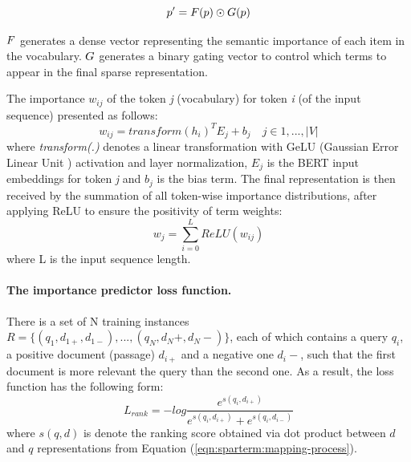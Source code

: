 \documentclass[
    twocolumn,
]{ceurart}
\begin{document}
    \begin{equation}
        \label{eqn:sparterm:mapping-process}
        p' = \mathnormal{F}(p) \odot \mathnormal{G}(p)
    \end{equation}

    $\mathnormal{F}$ generates a dense vector representing the semantic importance of each item
    in the vocabulary. $\mathnormal{G}$ generates a binary gating vector to control which terms
    to appear in the final sparse representation.

    The importance $w_{ij}$ of the token \emph{j} (vocabulary) for token \emph{i} (of the input
    sequence) presented as follows:
    \begin{equation}
        w_{ij}=transform(h_i)^T E_j + b_j \quad j \in {1, ..., |V|}
    \end{equation}
    where \emph{transform(.)} denotes a linear transformation with GeLU
    (Gaussian Error Linear Unit \cite{hendrycks2016gelu}) activation and layer normalization,
    $E_j$ is the BERT input embeddings for token \emph{j} and $b_j$ is the bias term.
    The final representation is then received by the summation of all token-wise importance
    distributions, after applying ReLU to ensure the positivity of term weights:
    \begin{equation}
        \label{eqn:sparterm:importance-predictor}
        w_j=\sum_{i=0}^L ReLU(w_{ij})
    \end{equation}
    where L is the input sequence length.

    \paragraph{The importance predictor loss function.}
    There is a set of N training instances $R=\{(q_1, d_{1+}, d_{1-}), ..., (q_N, d_N+, d_N-)\}$,
    each of which contains a query $q_i$, a positive document (passage) $d_{i+}$ and a negative
    one $d_i-$, such that the first document is more relevant the query than the second one.
    As a result, the loss function has the following form:
    \begin{equation}
        \label{eqn:sparterm:loss}
        L_{rank} = -log \frac
        {e^{s(q_i,d_{i+})}}
        {e^{s(q_i,d_{i+})} + e^{s(q_i,d_{i-})}}
    \end{equation}
    where $s(q,d)$ is denote the ranking score obtained via dot product between $d$ and $q$
    representations from Equation (\ref{eqn:sparterm:mapping-process}).
\end{document}
